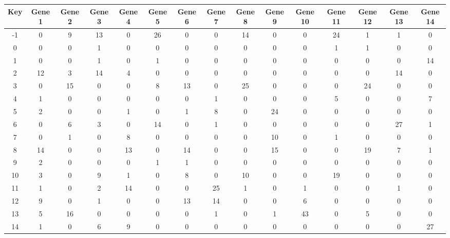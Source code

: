 \begin{tabular}{|c|c|c|c|c|c|c|c|c|c|c|c|c|c|c|}
\hline
Key & Gene 1 & Gene 2 & Gene 3 & Gene 4 & Gene 5 & Gene 6 & Gene 7 & Gene 8 & Gene 9 & Gene 10 & Gene 11 & Gene 12 & Gene 13 & Gene 14 \\
\hline
-1 & 0 & 9 & 13 & 0 & 26 & 0 & 0 & 14 & 0 & 0 & 24 & 1 & 1 & 0 \\
0 & 0 & 0 & 1 & 0 & 0 & 0 & 0 & 0 & 0 & 0 & 1 & 1 & 0 & 0 \\
1 & 0 & 0 & 1 & 0 & 1 & 0 & 0 & 0 & 0 & 0 & 0 & 0 & 0 & 14 \\
2 & 12 & 3 & 14 & 4 & 0 & 0 & 0 & 0 & 0 & 0 & 0 & 0 & 14 & 0 \\
3 & 0 & 15 & 0 & 0 & 8 & 13 & 0 & 25 & 0 & 0 & 0 & 24 & 0 & 0 \\
4 & 1 & 0 & 0 & 0 & 0 & 0 & 1 & 0 & 0 & 0 & 5 & 0 & 0 & 7 \\
5 & 2 & 0 & 0 & 1 & 0 & 1 & 8 & 0 & 24 & 0 & 0 & 0 & 0 & 0 \\
6 & 0 & 6 & 3 & 0 & 14 & 0 & 1 & 0 & 0 & 0 & 0 & 0 & 27 & 1 \\
7 & 0 & 1 & 0 & 8 & 0 & 0 & 0 & 0 & 10 & 0 & 1 & 0 & 0 & 0 \\
8 & 14 & 0 & 0 & 13 & 0 & 14 & 0 & 0 & 15 & 0 & 0 & 19 & 7 & 1 \\
9 & 2 & 0 & 0 & 0 & 1 & 1 & 0 & 0 & 0 & 0 & 0 & 0 & 0 & 0 \\
10 & 3 & 0 & 9 & 1 & 0 & 8 & 0 & 10 & 0 & 0 & 19 & 0 & 0 & 0 \\
11 & 1 & 0 & 2 & 14 & 0 & 0 & 25 & 1 & 0 & 1 & 0 & 0 & 1 & 0 \\
12 & 9 & 0 & 1 & 0 & 0 & 13 & 14 & 0 & 0 & 6 & 0 & 0 & 0 & 0 \\
13 & 5 & 16 & 0 & 0 & 0 & 0 & 1 & 0 & 1 & 43 & 0 & 5 & 0 & 0 \\
14 & 1 & 0 & 6 & 9 & 0 & 0 & 0 & 0 & 0 & 0 & 0 & 0 & 0 & 27 \\
\hline
\end{tabular}
